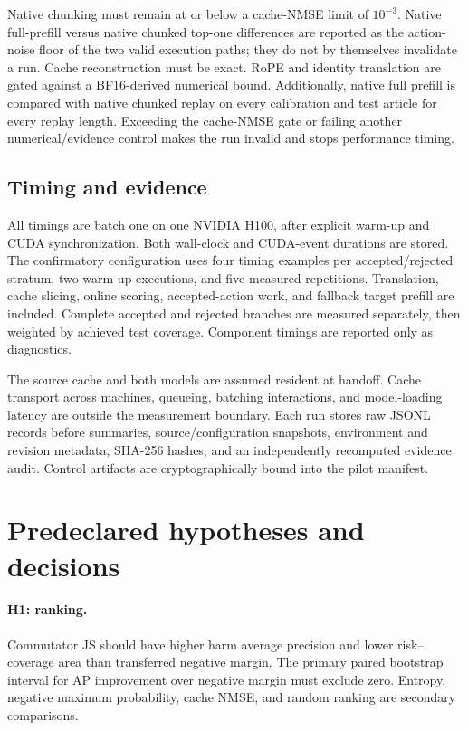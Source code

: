 \documentclass[10pt,twocolumn]{article}
\begin{document}
Native chunking must remain at or below a cache-NMSE limit of $10^{-3}$.
Native full-prefill versus native chunked top-one differences are reported as
the action-noise floor of the two valid execution paths; they do not by
themselves invalidate a run.  Cache reconstruction must be exact.  RoPE and
identity translation are gated against a BF16-derived numerical bound.
Additionally, native full prefill is compared with native chunked replay on
every calibration and test article for every replay length.  Exceeding the
cache-NMSE gate or failing another numerical/evidence control makes the run
invalid and stops performance timing.

\subsection{Timing and evidence}

All timings are batch one on one NVIDIA H100, after explicit warm-up and CUDA
synchronization.  Both wall-clock and CUDA-event durations are stored.  The
confirmatory configuration uses four timing examples per accepted/rejected
stratum, two warm-up executions, and five measured repetitions.  Translation,
cache slicing, online scoring, accepted-action work, and fallback target
prefill are included.  Complete accepted and rejected branches are measured
separately, then weighted by achieved test coverage.  Component timings are
reported only as diagnostics.

The source cache and both models are assumed resident at handoff.  Cache
transport across machines, queueing, batching interactions, and model-loading
latency are outside the measurement boundary.  Each run stores raw JSONL
records before summaries, source/configuration snapshots, environment and
revision metadata, SHA-256 hashes, and an independently recomputed evidence
audit.  Control artifacts are cryptographically bound into the pilot manifest.

\section{Predeclared hypotheses and decisions}

\paragraph{H1: ranking.}
Commutator JS should have higher harm average precision and lower
risk--coverage area than transferred negative margin.  The primary paired
bootstrap interval for AP improvement over negative margin must exclude zero.
Entropy, negative maximum probability, cache NMSE, and random ranking are
secondary comparisons.
\end{document}
